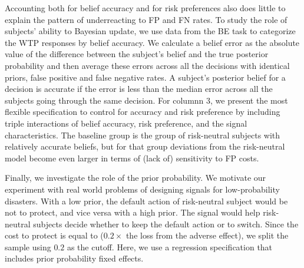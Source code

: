 \documentclass[12pt,a4paper]{article}
\begin{document}
Accounting both for belief accuracy and for risk preferences also does little to explain the pattern of underreacting to FP and FN rates. To study the role of subjects' ability to Bayesian update, we use data from the BE task to categorize the WTP responses by belief accuracy. We calculate a belief error as the absolute value of the difference between the subject's belief and the true posterior probability and then average these errors across all the decisions with identical priors, false positive and false negative rates. A subject's posterior belief for a decision is accurate if the error is less than the median error across all the subjects going through the same decision. For columnn 3, we present the most flexible specification to control for accuracy and risk preference by including triple interactions of belief accuracy, risk preference, and the signal characteristics. The baseline group is the group of risk-neutral subjects with relatively accurate beliefs, but for that group deviations from the risk-neutral model become even larger in terms of (lack of) sensitivity to FP costs.

Finally, we investigate the role of the prior probability. We motivate our experiment with real world problems of designing signals for low-probability disasters. With a low prior, the default action of risk-neutral subject would be not to protect, and vice versa with a high prior. The signal would help risk-neutral subjects decide whether to keep the default action or to switch. Since the cost to protect is equal to ($0.2 \times$ the loss from the adverse effect), we split the sample using $0.2$ as the cutoff. Here, we use a regression specification that includes prior probability fixed effects. 
\end{document}

